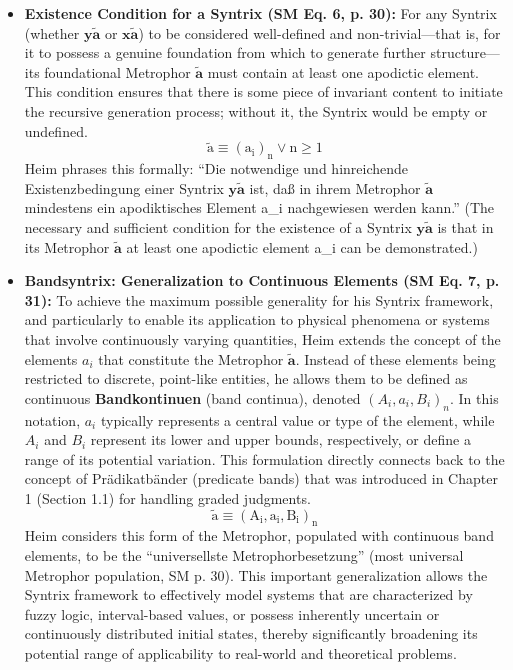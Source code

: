 \documentclass[12pt]{article}
\newcommand{\q}[1]{\enquote{#1}}
\newcommand{\syntrix}{\bm{y\widetilde{a}}}
\newcommand{\homogeneoussyntrix}{\bm{x\widetilde{a}}}
\newcommand{\metrophor}{\bm{\widetilde{a}}}
\begin{document}
\begin{itemize}
    \item \textbf{Existence Condition for a Syntrix (SM Eq. 6, p. 30):}
    For any Syntrix (whether \( \syntrix \) or \( \homogeneoussyntrix \)) to be considered well-defined and non-trivial—that is, for it to possess a genuine foundation from which to generate further structure—its foundational Metrophor \( \metrophor \) must contain at least one apodictic element. This condition ensures that there is some piece of invariant content to initiate the recursive generation process; without it, the Syntrix would be empty or undefined.
        \begin{equation}
        \tilde{\mathrm{a}} \equiv (\mathrm{a}_{\mathrm{i}})_{\mathrm{n}} \lor \mathrm{n} \ge 1 \tag{6}
        \label{eq:original_syntrix_existence}
        \end{equation}
    Heim phrases this formally: \q{Die notwendige und hinreichende Existenzbedingung einer Syntrix \( \syntrix \) ist, daß in ihrem Metrophor \( \metrophor \) mindestens ein apodiktisches Element a\_i nachgewiesen werden kann.} (The necessary and sufficient condition for the existence of a Syntrix \( \syntrix \) is that in its Metrophor \( \metrophor \) at least one apodictic element a\_i can be demonstrated.)

    \item \textbf{Bandsyntrix: Generalization to Continuous Elements (SM Eq. 7, p. 31):}
    To achieve the maximum possible generality for his Syntrix framework, and particularly to enable its application to physical phenomena or systems that involve continuously varying quantities, Heim extends the concept of the elements \( a_i \) that constitute the Metrophor \( \metrophor \). Instead of these elements being restricted to discrete, point-like entities, he allows them to be defined as continuous \textbf{Bandkontinuen} (band continua), denoted \( (A_i, a_i, B_i)_n \). In this notation, \( a_i \) typically represents a central value or type of the element, while \( A_i \) and \( B_i \) represent its lower and upper bounds, respectively, or define a range of its potential variation. This formulation directly connects back to the concept of Prädikatbänder (predicate bands) that was introduced in Chapter 1 (Section 1.1) for handling graded judgments.
        \begin{equation}
        \tilde{\mathrm{a}} \equiv (\mathrm{A}_{\mathrm{i}}, \mathrm{a}_{\mathrm{i}}, \mathrm{B}_{\mathrm{i}})_{\mathrm{n}} \tag{7}
        \label{eq:original_bandsyntrix}
        \end{equation}
    Heim considers this form of the Metrophor, populated with continuous band elements, to be the \q{universellste Metrophorbesetzung} (most universal Metrophor population, SM p. 30). This important generalization allows the Syntrix framework to effectively model systems that are characterized by fuzzy logic, interval-based values, or possess inherently uncertain or continuously distributed initial states, thereby significantly broadening its potential range of applicability to real-world and theoretical problems.
\end{itemize}
\end{document}

